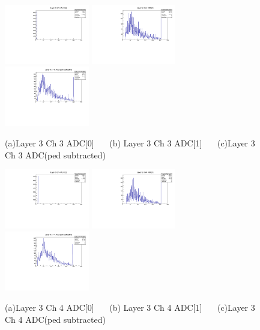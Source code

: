 \documentclass[a4paper,11pt]{article}
\theoremstyle{mytheor}
\begin{document}
\begin{figure}[H] 
\vspace*{-0.3cm} 
\includegraphics[width=0.33\textwidth,scale=0.5,trim=0 0 0 0,clip]{plotsdir/file0_muons-Layer3_Ch3_adc0-1.pdf} 
\includegraphics[width=0.33\textwidth,scale=0.5,trim=0 0 0 0,clip]{plotsdir/file0_muons-Layer3_Ch3_adc1-1.pdf} 
\includegraphics[width=0.33\textwidth,scale=0.5,trim=0 0 0 0,clip]{plotsdir/file0_muons-Layer3_Ch3_adcPedsub-1.pdf} 
\caption{(a)Layer 3 Ch 3 ADC[0] ~~~(b) Layer 3 Ch 3 ADC[1] ~~~(c)Layer 3 Ch 3 ADC(ped subtracted) } 
\end{figure} 
\begin{figure}[H] 
\vspace*{-0.3cm} 
\includegraphics[width=0.33\textwidth,scale=0.5,trim=0 0 0 0,clip]{plotsdir/file0_muons-Layer3_Ch4_adc0-1.pdf} 
\includegraphics[width=0.33\textwidth,scale=0.5,trim=0 0 0 0,clip]{plotsdir/file0_muons-Layer3_Ch4_adc1-1.pdf} 
\includegraphics[width=0.33\textwidth,scale=0.5,trim=0 0 0 0,clip]{plotsdir/file0_muons-Layer3_Ch4_adcPedsub-1.pdf} 
\caption{(a)Layer 3 Ch 4 ADC[0] ~~~(b) Layer 3 Ch 4 ADC[1] ~~~(c)Layer 3 Ch 4 ADC(ped subtracted) } 
\end{figure} 
\end{document}
